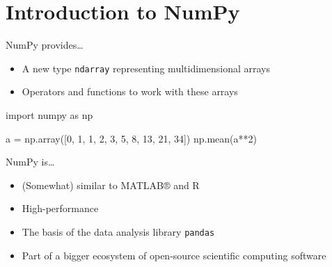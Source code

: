 \section{Introduction to NumPy}

\begin{frame}[fragile]{NumPy provides\ldots}
    \begin{itemize}
        \item A new type \texttt{ndarray} representing
              multidimensional arrays
        \item Operators and functions to work with these arrays
    \end{itemize}
    \vfill
    \begin{py3}
        import numpy as np

        a = np.array([0, 1, 1, 2, 3, 5, 8, 13, 21, 34])
        np.mean(a**2)
    \end{py3}
\end{frame}

\begin{frame}{NumPy is\ldots}
    \begin{itemize}
        \setlength{\itemsep}{0.75em}
        \item (Somewhat) similar to MATLAB® and R
        \item High\hyp{}performance
        \item The basis of the data analysis library \texttt{pandas}
        \item Part of a bigger ecosystem of open\hyp{}source scientific
              computing software
    \end{itemize}
\end{frame}



